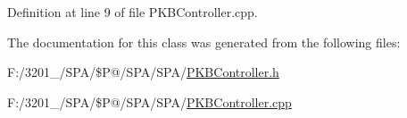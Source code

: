 Definition at line 9 of file P\-K\-B\-Controller.\-cpp.



The documentation for this class was generated from the following files\-:\begin{DoxyCompactItemize}
\item 
F\-:/3201\-\_/\-S\-P\-A/\$\-P@/\-S\-P\-A/\-S\-P\-A/\hyperlink{_p_k_b_controller_8h}{P\-K\-B\-Controller.\-h}\item 
F\-:/3201\-\_/\-S\-P\-A/\$\-P@/\-S\-P\-A/\-S\-P\-A/\hyperlink{_p_k_b_controller_8cpp}{P\-K\-B\-Controller.\-cpp}\end{DoxyCompactItemize}
